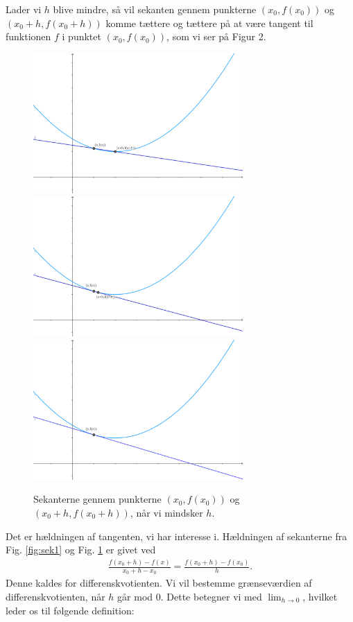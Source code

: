 Lader vi $h$ blive mindre, så vil sekanten gennem punkterne $(x_0,f(x_0))$ og $(x_0+h,f(x_0+h))$ komme tættere og tættere på at være tangent til funktionen $f$ i punktet $(x_0,f(x_0))$, som vi ser på Figur 2.
\begin{figure}[H]
\includegraphics[width = 8cm]{Billeder/sekant2.png}
\includegraphics[width = 8cm]{Billeder/sekant3.png}
\includegraphics[width=8cm]{Billeder/tangent1.png}
\caption{Sekanterne gennem punkterne $(x_0,f(x_0))$ og $(x_0+h,f(x_0+h))$, når vi mindsker $h$. }
\label{fig:sek2}
\end{figure}
Det er hældningen af tangenten, vi har interesse i. Hældningen af sekanterne fra Fig. \ref{fig:sek1} og Fig. \ref{fig:sek2} er givet ved
\begin{align*}
\frac{f(x_0+h)-f(x)}{x_0+h-x_0} = \frac{f(x_0+h)-f(x_0)}{h}.
\end{align*}
Denne kaldes for differenskvotienten. Vi vil bestemme grænseværdien af differenskvotienten, når $h$ går mod $0$. Dette betegner vi med $\lim_{h\to 0}$, hvilket leder os til følgende definition:
